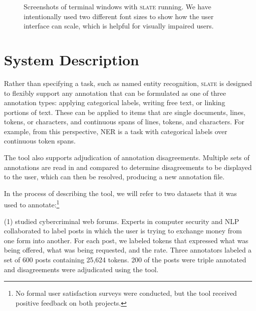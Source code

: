 \documentclass[11pt,a4paper]{article}
\newcommand\slate{\textsc{slate}\xspace}
\begin{document}
\begin{figure}
\begin{minipage}[b]{.48\linewidth}
  \label{fig:adjudicate}
  \end{minipage}
  \caption{
  Screenshots of terminal windows with \slate running.
  We have intentionally used two different font sizes to show how the user interface can scale, which is helpful for visually impaired users.
  }\label{fig:screenshot}
\end{figure}

\section{System Description}

Rather than specifying a task, such as named entity recognition, \slate is designed to flexibly support any annotation that can be formulated as one of three annotation types: applying categorical labels, writing free text, or linking portions of text.
These can be applied to items that are single documents, lines, tokens, or characters, and continuous spans of lines, tokens, and characters.
For example, from this perspective, NER is a task with categorical labels over continuous token spans.

The tool also supports adjudication of annotation disagreements.
Multiple sets of annotations are read in and compared to determine disagreements to be displayed to the user, which can then be resolved, producing a new annotation file.

In the process of describing the tool, we will refer to two datasets that it was used to annotate:\footnote{
No formal user satisfaction surveys were conducted, but the tool received positive feedback on both projects.
}

(1) \citet{www17forums} studied cybercriminal web forums.
Experts in computer security and NLP collaborated to label posts in which the user is trying to exchange money from one form into another.
For each post, we labeled tokens that expressed what was being offered, what was being requested, and the rate.
Three annotators labeled a set of 600 posts containing 25,624 tokens.
200 of the posts were triple annotated and disagreements were adjudicated using the tool.
\end{document}
